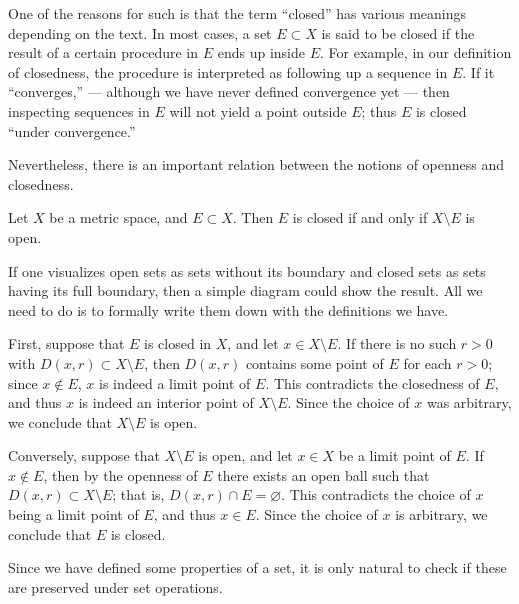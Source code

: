 One of the reasons for such is that
the term ``closed'' has various meanings depending on the text.
In most cases,
a set \(E\subset X\) is said to be closed
if the result of a certain procedure in \(E\) ends up inside \(E\).
For example, in our definition of closedness,
the procedure is interpreted as following up a sequence in \(E\).
If it ``converges,''
--- although we have never defined convergence yet ---
then inspecting sequences in \(E\) will not yield a point outside \(E\);
thus \(E\) is closed ``under convergence.''

Nevertheless, there is an important relation
between the notions of openness and closedness.

\begin{proposition}
    \label{prop:opclcompl}
    Let \(X\) be a metric space, and \(E\subset X\).
    Then \(E\) is closed if and only if \(X\setminus E\) is open.
\end{proposition}
\begin{sketch}
    If one visualizes open sets as sets without its boundary
    and closed sets as sets having its full boundary,
    then a simple diagram could show the result.
    All we need to do is
    to formally write them down with the definitions we have.
\end{sketch}
\begin{myproof}
    First, suppose that \(E\) is closed in \(X\),
    and let \(x\in X\setminus E\).
    If there is no such \(r>0\) with \(D(x,r)\subset X\setminus E\),
    then \(D(x,r)\) contains some point of \(E\) for each \(r>0\);
    since \(x\notin E\), \(x\) is indeed a limit point of \(E\).
    This contradicts the closedness of \(E\),
    and thus \(x\) is indeed an interior point of \(X\setminus E\).
    Since the choice of \(x\) was arbitrary,
    we conclude that \(X\setminus E\) is open.

    Conversely, suppose that \(X\setminus E\) is open,
    and let \(x\in X\) be a limit point of \(E\).
    If \(x\notin E\),
    then by the openness of \(E\) there exists an open ball such that
    \(D(x,r)\subset X\setminus E\);
    that is, \(D(x,r)\cap E=\varnothing\).
    This contradicts the choice of \(x\) being a limit point of \(E\),
    and thus \(x\in E\).
    Since the choice of \(x\) is arbitrary,
    we conclude that \(E\) is closed.
\end{myproof}

Since we have defined some properties of a set,
it is only natural to check
if these are preserved under set operations.

